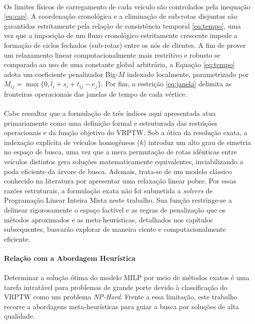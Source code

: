 \paragraph{} Os limites físicos de carregamento de cada veículo são controlados pela inequação \eqref{eq:cap}. A coordenação cronológica e a eliminação de sub-rotas disjuntas são garantidas estritamente pela relação de consistência temporal \eqref{eq:tempo}, uma vez que a imposição de um fluxo cronológico estritamente crescente impede a formação de ciclos fechados (sub-rotas) entre os nós de clientes. A fim de prover um relaxamento linear computacionalmente mais restritivo e robusto se comparado ao uso de uma constante global arbitrária, a Equação \eqref{eq:tempo} adota um coeficiente penalizador Big-$M$ indexado localmente, parametrizado por $M_{ij} = \max\{0, l_i + s_i + t_{ij} - e_j\}$. Por fim, a restrição \eqref{eq:janela} delimita as fronteiras operacionais das janelas de tempo de cada vértice.

\paragraph{} Cabe ressaltar que a formulação de três índices aqui apresentada atua primariamente como uma definição formal e estruturada das restrições operacionais e da função objetivo do VRPTW. Sob a ótica da resolução exata, a indexação explícita de veículos homogêneos ($k$) introduz um alto grau de simetria no espaço de busca, uma vez que a mera permutação de rotas idênticas entre veículos distintos gera soluções matematicamente equivalentes, inviabilizando a poda eficiente da árvore de busca. Ademais, trata-se de um modelo clássico conhecido na literatura por apresentar uma relaxação linear pobre. Por essas razões estruturais, a formulação exata não foi submetida a \textit{solvers} de Programação Linear Inteira Mista neste trabalho. Sua função restringe-se a delinear rigorosamente o espaço factível e as regras de penalização que os métodos aproximados e as meta-heurísticas, detalhados nos capítulos subsequentes, buscarão explorar de maneira ciente e computacionalmente eficiente.

\paragraph{Relação com a Abordagem Heurística}

\paragraph{} Determinar a solução ótima do modelo MILP por meio de métodos exatos é uma tarefa intratável para problemas de grande porte devido à classificação do VRPTW como um problema \textit{NP-Hard}. Frente a essa limitação, este trabalho recorre a abordagens meta-heurísticas para guiar a busca por soluções de alta qualidade.

